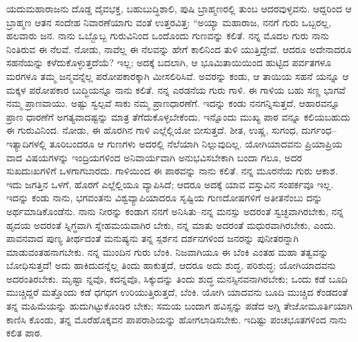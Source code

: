 ಯದುಮಹಾರಾಜನು ದೊಡ್ಡ ದೈವಭಕ್ತ, ಬಹುಬುದ್ಧಿಶಾಲಿ, ಪುಷಿ ಬ್ರಾಹ್ಮಣರಲ್ಲಿ ತುಂಬ ಆದರವುಳ್ಳವನು. ಆದ್ದರಿಂದ ಆ ಬ್ರಾಹ್ಮಣ ಆತನ ಸಂದೇಹ ನಿವಾರಣೆಯಾಗು ವಂತೆ ಉತ್ತರವಿತ್ತ: “ಅಯ್ಯಾ ಮಹಾರಾಜ, ನನಗೆ ಗುರು ಒಬ್ಬರಲ್ಲ, ಹಲವಾರು ಜನ. ನಾನು ಒಬ್ಬೊಬ್ಬ ಗುರುವಿನಿಂದ ಒಂದೊಂದು ಗುಣವನ್ನು ಕಲಿತೆ. ನನ್ನ ಮೊದಲ ಗುರು ನಾನು ನಿಂತಿರುವ ಈ ನೆಲವೆ. ನೋಡು, ನಾವೆಲ್ಲ ಈ ನೆಲವನ್ನು ಹೇಗೆ ಕಾಲಿನಿಂದ ತುಳಿ ಯುತ್ತಿದ್ದೇವೆ. ಆದರೂ ಅದೇನಾದರೂ ಸಹನೆಯನ್ನು ಕಳೆದುಕೊಳ್ಳುತ್ತದೆಯೆ? ಇಲ್ಲ; ಅದಕ್ಕೆ ಬದಲಾಗಿ, ಆ ಭೂಮಿತಾಯಿಯಿಂದ ಹುಟ್ಟಿದ ಪರ್ವತಗಳೂ ಮರಗಳೂ ತಮ್ಮ ಜನ್ಮವನ್ನೆಲ್ಲ ಪರೋಪಕಾರಕ್ಕಾಗಿ ಮೀಸಲಿರಿಸಿವೆ. ಅವರನ್ನು ಕಂಡು, ಆ ತಾಯಿಯ ಸಹನೆ ಯನ್ನೂ ಆ ಮಕ್ಕಳ ಪರೋಪಕಾರ ಬುದ್ಧಿಯನ್ನೂ ನಾನು ಕಲಿತೆ. ನನ್ನ ಎರಡನೆಯ ಗುರು ಗಾಳಿ. ಈ ಗಾಳಿಯ ಬಹು ಸಣ್ಣ ಭಾಗವೆ ನಮ್ಮ ಪ್ರಾಣವಾಯು. ಅಷ್ಟು ಸ್ವಲ್ಪವೆ ಸಾಕು ನಮ್ಮ ಪ್ರಾಣಧಾರಣೆಗೆ. ಇದನ್ನು ಕಂಡು ನನಗನ್ನಿಸುತ್ತದೆ, ಆಹಾರವನ್ನೂ ಪ್ರಾಣ ಧಾರಣೆಗೆ ಅಗತ್ಯವಾದಷ್ಟನ್ನು ಮಾತ್ರ ತೆಗೆದುಕೊಳ್ಳಬೇಕೆಂದು. ಇನ್ನೊಂದು ಮುಖ್ಯ ಪಾಠ ವನ್ನೂ ಕಲಿಯಬಹುದು ಈ ಗುರುವಿನಿಂದ. ನೋಡು, ಈ ಹೊರಗಿನ ಗಾಳಿ ಎಲ್ಲೆಲ್ಲಿಯೋ ಬೀಸುತ್ತದೆ. ಶೀತ, ಉಷ್ಣ, ಸುಗಂಧ, ದುರ್ಗಂಧ–ಇತ್ಯಾದಿಗಳಲ್ಲಿ ತೂರಿಬಂದರೂ ಆ ಗುಣಗಳು ಅದರಲ್ಲಿ ನೆಲೆಯಾಗಿ ನಿಲ್ಲುವುದಿಲ್ಲ. ಯೋಗಿಯಾದವನು ಪ್ರಿಯಾಪ್ರಿಯ ವಾದ ವಿಷಯಗಳನ್ನು ಇಂದ್ರಿಯಗಳಿಂದ ಅನಿವಾರ್ಯವಾಗಿ ಅನುಭವಿಸಬೇಕಾಗಿ ಬಂದಾ ಗಲೂ, ಅದರ ಸುಖದುಃಖಗಳಿಗೆ ಒಳಗಾಗಬಾರದು. ಗಾಳಿಯಿಂದ ಈ ಪಾಠವನ್ನು ನಾನು ಕಲಿತೆ. ನನ್ನ ಮೂರನೆಯ ಗುರು ಆಕಾಶ. ಇದು ಜಗತ್ತಿನ ಒಳಗೆ, ಹೊರಗೆ ಎಲ್ಲೆಲ್ಲಿಯೂ ವ್ಯಾಪಿಸಿದೆ; ಆದರೂ ಅದಕ್ಕೆ ಯಾವ ವಸ್ತುವಿನ ಸಂಪರ್ಕವೂ ಇಲ್ಲ. ಇದನ್ನು ಕಂಡು ನಾನು, ಭಗವಂತನು ವಿಶ್ವವ್ಯಾಪಿಯಾದರೂ ಸೃಷ್ಟಿಯ ಗುಣದೋಷಗಳಿಗೆ ಅತೀತನೆಂಬು ದನ್ನು ಅರ್ಥಮಾಡಿಕೊಂಡೆನು. ನಾನು ನೀರನ್ನು ಕಂಡಾಗ ನನಗೆ ಅನಿಸಿತು–ನನ್ನ ಮನಸ್ಸು ಅದರಂತೆ ಸ್ವಚ್ಛವಾಗಿರಬೇಕು, ನನ್ನ ಹೃದಯ ಅದರಂತೆ ಸ್ನಿಗ್ಧವಾಗಿ ಸ್ನೇಹಮಯವಾಗಿರ ಬೇಕು, ನನ್ನ ಮಾತು ಅದರಂತೆ ಮಧುರವಾಗಿರಬೇಕು, ಎಂದು. ಪಾವನವಾದ ಪುಣ್ಯ ತೀರ್ಥದಂತೆ ಮನುಷ್ಯನು ತನ್ನ ಸ್ಪರ್ಶನ ದರ್ಶನಗಳಿಂದ ಜನರನ್ನು ಪುನೀತರನ್ನಾಗಿ ಮಾಡುವಂತಹನಾಗಬೇಕು. ನನ್ನ ಮುಂದಿನ ಗುರು ಬೆಂಕಿ. ನಿಜವಾಗಿಯೂ ಈ ಬೆಂಕಿ ಎಂತಹ ಮಹಾ ತತ್ವವನ್ನು ಬೋಧಿಸುತ್ತದೆ! ಅದು ಹಾಕಿದುದನ್ನೆಲ್ಲ ತಿಂದು ಹಾಕುತ್ತದೆ, ಆದರೂ ಅದು ಶುದ್ಧ, ಪರಿಶುದ್ಧ; ಯೋಗಿಯಾದವನು ಅದರಂತಿರಬೇಕು. ಮೃಷ್ಟಾ ನ್ನವೊ, ಕದನ್ನವೊ, ಸಿಕ್ಕುದನ್ನು ತಿಂದು ಶುದ್ಧ ಮನಸ್ಸಿನವನಾಗಿರಬೇಕು; ಒಂದು ಕಡೆ ಬೂದಿ ಮುಚ್ಚಿದ್ದರೆ ಮತ್ತೊಂದು ಕಡೆ ಧಗಧಗ ಉರಿಯುತ್ತಿರುತ್ತದೆ, ಬೆಂಕಿ. ಯೋಗಿ ಯಾದವನು ಬೂದಿ ಮುಚ್ಚಿದ ಕೆಂಡದಂತೆ ತನ್ನ ಮಹಿಮೆಯನ್ನು ಹುದುಗಿಟ್ಟುಕೊಂಡಿರ ಬೇಕು; ಸಮಯ ಬಂದಾಗ ಹವಿಸ್ಸನ್ನು ಪಡೆದ ಅಗ್ನಿ ತೇಜೋಮೂರ್ತಿಯಾಗಿ ಕಾಣಿಸಿ ಕೊಂಡು, ತನ್ನ ಮೊರೆಹೊಕ್ಕವನ ಪಾಪರಾಶಿಯನ್ನು ಹೋಗಲಾಡಿಸಬೇಕು. ಇದಿಷ್ಟು ಪಂಚಭೂತಗಳಿಂದ ನಾನು ಕಲಿತ ಪಾಠ. 

